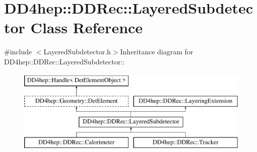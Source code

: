 \hypertarget{class_d_d4hep_1_1_d_d_rec_1_1_layered_subdetector}{
\section{DD4hep::DDRec::LayeredSubdetector Class Reference}
\label{class_d_d4hep_1_1_d_d_rec_1_1_layered_subdetector}
}


{\ttfamily \#include $<$LayeredSubdetector.h$>$}Inheritance diagram for DD4hep::DDRec::LayeredSubdetector::\begin{figure}[H]
\begin{center}
\leavevmode
\includegraphics[height=4cm]{class_d_d4hep_1_1_d_d_rec_1_1_layered_subdetector}
\end{center}
\end{figure}
